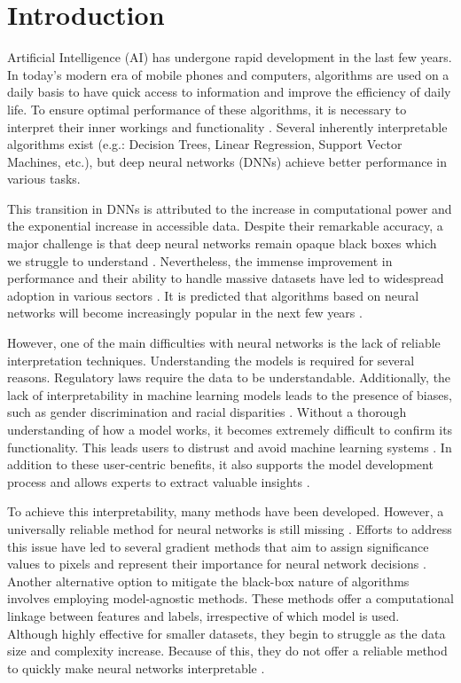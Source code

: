 
\chapter{Introduction}

Artificial Intelligence (AI) has undergone rapid development in the last few years. In today's modern era of mobile phones and computers, algorithms are used on a daily basis to have quick access to information and improve the efficiency of daily life. To ensure optimal performance of these algorithms, it is necessary to interpret their inner workings and functionality \cite{allen2023interpretable}. Several inherently interpretable algorithms exist (e.g.: Decision Trees, Linear Regression, Support Vector Machines, etc.), but deep neural networks (DNNs) achieve better performance in various tasks.

This transition in DNNs is attributed to the increase in computational power and the exponential increase in accessible data. Despite their remarkable accuracy, a major challenge is that deep neural networks remain opaque black boxes which we struggle to understand \cite{Samek_2019}. Nevertheless, the immense improvement in performance and their ability to handle massive datasets have led to widespread adoption in various sectors \cite{zhang2022ai}. It is predicted that algorithms based on neural networks will become increasingly popular in the next few years \cite{zhang2022ai}.

However, one of the main difficulties with neural networks is the lack of reliable interpretation techniques. Understanding the models is required for several reasons. Regulatory laws require the data to be understandable. Additionally, the lack of interpretability in machine learning models leads to the presence of biases, such as gender discrimination and racial disparities \cite{allen2023interpretable}. Without a thorough understanding of how a model works, it becomes extremely difficult to confirm its functionality. This leads users to distrust and avoid machine learning systems \cite{allen2023interpretable}. In addition to these user-centric benefits, it also supports the model development process and allows experts to extract valuable insights \cite{Samek_2019}.
 
To achieve this interpretability, many methods have been developed. However, a universally reliable method for neural networks is still missing \cite{molnar2022}. Efforts to address this issue have led to several gradient methods that aim to assign significance values to pixels and represent their importance for neural network decisions \cite{Samek_2019}. Another alternative option to mitigate the black-box nature of algorithms involves employing model-agnostic methods. These methods offer a computational linkage between features and labels, irrespective of which model is used. Although highly effective for smaller datasets, they begin to struggle as the data size and complexity increase. Because of this, they do not offer a reliable method to quickly make neural networks interpretable \cite{molnar2022}.

